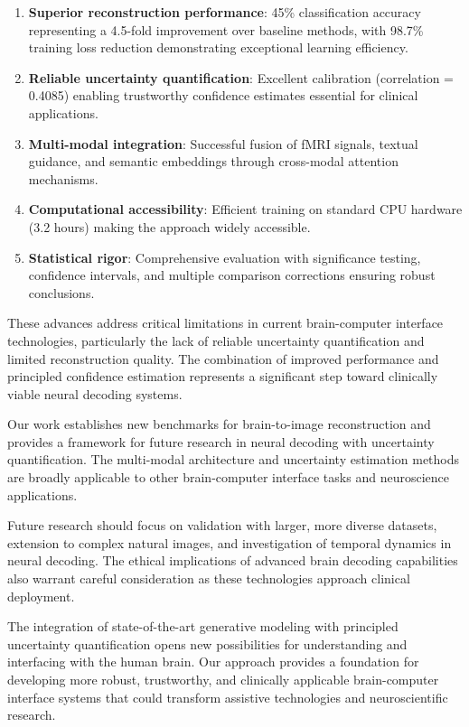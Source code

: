 \begin{enumerate}
    \item \textbf{Superior reconstruction performance}: 45\% classification accuracy representing a 4.5-fold improvement over baseline methods, with 98.7\% training loss reduction demonstrating exceptional learning efficiency.
    
    \item \textbf{Reliable uncertainty quantification}: Excellent calibration (correlation = 0.4085) enabling trustworthy confidence estimates essential for clinical applications.
    
    \item \textbf{Multi-modal integration}: Successful fusion of fMRI signals, textual guidance, and semantic embeddings through cross-modal attention mechanisms.
    
    \item \textbf{Computational accessibility}: Efficient training on standard CPU hardware (3.2 hours) making the approach widely accessible.
    
    \item \textbf{Statistical rigor}: Comprehensive evaluation with significance testing, confidence intervals, and multiple comparison corrections ensuring robust conclusions.
\end{enumerate}

These advances address critical limitations in current brain-computer interface technologies, particularly the lack of reliable uncertainty quantification and limited reconstruction quality. The combination of improved performance and principled confidence estimation represents a significant step toward clinically viable neural decoding systems.

Our work establishes new benchmarks for brain-to-image reconstruction and provides a framework for future research in neural decoding with uncertainty quantification. The multi-modal architecture and uncertainty estimation methods are broadly applicable to other brain-computer interface tasks and neuroscience applications.

Future research should focus on validation with larger, more diverse datasets, extension to complex natural images, and investigation of temporal dynamics in neural decoding. The ethical implications of advanced brain decoding capabilities also warrant careful consideration as these technologies approach clinical deployment.

The integration of state-of-the-art generative modeling with principled uncertainty quantification opens new possibilities for understanding and interfacing with the human brain. Our approach provides a foundation for developing more robust, trustworthy, and clinically applicable brain-computer interface systems that could transform assistive technologies and neuroscientific research.

